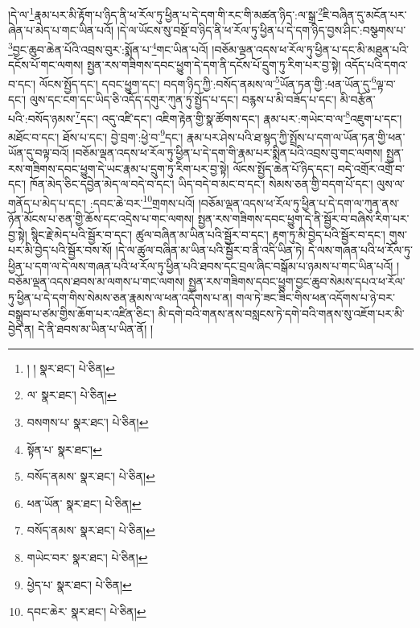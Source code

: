 །དེ་ལ་\footnote{། །  སྣར་ཐང་།  པེ་ཅིན། }རྣམ་པར་མི་རྟོག་པ་ཉིད་ནི་ཕ་རོལ་ཏུ་ཕྱིན་པ་དེ་དག་གི་རང་གི་མཚན་ཉིད་:ལ་སྒྲ་\footnote{ལ་  སྣར་ཐང་།  པེ་ཅིན། }ཇི་བཞིན་དུ་མངོན་པར་ཞེན་པ་མེད་པ་གང་ཡིན་པའོ། །དེ་ལ་ཡོངས་སུ་བསྔོ་བ་ཉིད་ནི་ཕ་རོལ་ཏུ་ཕྱིན་པ་དེ་དག་ཉིད་བྱས་ཤིང་:བསྩགས་པ་\footnote{བསགས་པ་  སྣར་ཐང་།  པེ་ཅིན། }བྱང་ཆུབ་ཆེན་པོའི་འབྲས་བུར་:སྨོན་པ་\footnote{སྟོན་པ་  སྣར་ཐང་། }གང་ཡིན་པའོ། །བཅོམ་ལྡན་འདས་ཕ་རོལ་ཏུ་ཕྱིན་པ་དང་མི་མཐུན་པའི་དངོས་པོ་གང་ལགས། སྤྱན་རས་གཟིགས་དབང་ཕྱུག་དེ་དག་ནི་དངོས་པོ་དྲུག་ཏུ་རིག་པར་བྱ་སྟེ། འདོད་པའི་དགའ་བ་དང་། ལོངས་སྤྱོད་དང་། དབང་ཕྱུག་དང་། བདག་ཉིད་ཀྱི་:བསོད་ནམས་ལ་\footnote{བསོད་ནམས་  སྣར་ཐང་།  པེ་ཅིན། }ཡོན་ཏན་གྱི་:ཕན་ཡོན་དུ་\footnote{ཕན་ཡོན་  སྣར་ཐང་།  པེ་ཅིན། }ལྟ་བ་དང་། ལུས་དང་ངག་དང་ཡིད་ཅི་འདོད་དགུར་ཀུན་ཏུ་སྤྱོད་པ་དང་། བརྙས་པ་མི་བཟོད་པ་དང་། མི་བརྩོན་པའི་:བསོད་ཉམས་\footnote{བསོད་ནམས་  སྣར་ཐང་།  པེ་ཅིན། }དང་། འདུ་འཛི་དང་། འཇིག་རྟེན་གྱི་སྣ་ཚོགས་དང་། རྣམ་པར་:གཡེང་བ་ལ་\footnote{གཡེང་བར་  སྣར་ཐང་།  པེ་ཅིན། }འཇུག་པ་དང་། མཐོང་བ་དང་། ཐོས་པ་དང་། བྱེ་བྲག་:ཕྱེ་བ་\footnote{ཕྱེད་པ་  སྣར་ཐང་།  པེ་ཅིན། }དང་། རྣམ་པར་ཤེས་པའི་ཐ་སྙད་ཀྱི་སྤྲོས་པ་དག་ལ་ཡོན་ཏན་གྱི་ཕན་ཡོན་དུ་བལྟ་བའོ། །བཅོམ་ལྡན་འདས་ཕ་རོལ་ཏུ་ཕྱིན་པ་དེ་དག་གི་རྣམ་པར་སྨིན་པའི་འབྲས་བུ་གང་ལགས། སྤྱན་རས་གཟིགས་དབང་ཕྱུག་དེ་ཡང་རྣམ་པ་དྲུག་ཏུ་རིག་པར་བྱ་སྟེ། ལོངས་སྤྱོད་ཆེན་པོ་ཉིད་དང་། བདེ་འགྲོར་འགྲོ་བ་དང་། ཁོན་མེད་ཅིང་དབྱེན་མེད་ལ་བདེ་བ་དང་། ཡིད་བདེ་བ་མང་བ་དང་། སེམས་ཅན་གྱི་བདག་པོ་དང་། ལུས་ལ་གནོད་པ་མེད་པ་དང་། :དབང་ཆེ་བར་\footnote{དབང་ཆེར་  སྣར་ཐང་།  པེ་ཅིན། }གྲགས་པའོ། །བཅོམ་ལྡན་འདས་ཕ་རོལ་ཏུ་ཕྱིན་པ་དེ་དག་ལ་ཀུན་ནས་ཉོན་མོངས་པ་ཅན་གྱི་ཆོས་དང་འདྲེས་པ་གང་ལགས། སྤྱན་རས་གཟིགས་དབང་ཕྱུག་དེ་ནི་སྦྱོར་བ་བཞིས་རིག་པར་བྱ་སྟེ། སྙིང་རྗེ་མེད་པའི་སྦྱོར་བ་དང་། ཚུལ་བཞིན་མ་ཡིན་པའི་སྦྱོར་བ་དང་། རྟག་ཏུ་མི་བྱེད་པའི་སྦྱོར་བ་དང་། གུས་པར་མི་བྱེད་པའི་སྦྱོར་བས་སོ། །དེ་ལ་ཚུལ་བཞིན་མ་ཡིན་པའི་སྦྱོར་བ་ནི་འདི་ཡིན་ཏེ། དེ་ལས་གཞན་པའི་ཕ་རོལ་ཏུ་ཕྱིན་པ་དག་ལ་དེ་ལས་གཞན་པའི་ཕ་རོལ་ཏུ་ཕྱིན་པའི་ཐབས་དང་བྲལ་ཞིང་བསྒོམ་པ་ཉམས་པ་གང་ཡིན་པའོ། །བཅོམ་ལྡན་འདས་ཐབས་མ་ལགས་པ་གང་ལགས། སྤྱན་རས་གཟིགས་དབང་ཕྱུག་བྱང་ཆུབ་སེམས་དཔའ་ཕ་རོལ་ཏུ་ཕྱིན་པ་དེ་དག་གིས་སེམས་ཅན་རྣམས་ལ་ཕན་འདོགས་པ་ན། གལ་ཏེ་ཟང་ཟིང་གིས་ཕན་འདོགས་པ་ཉེ་བར་བསྒྲུབ་པ་ཙམ་གྱིས་ཆོག་པར་འཛིན་ཅིང་། མི་དགེ་བའི་གནས་ནས་བསླངས་ཏེ་དགེ་བའི་གནས་སུ་འཇོག་པར་མི་བྱེད་ན། དེ་ནི་ཐབས་མ་ཡིན་པ་ཡིན་ནོ། །

